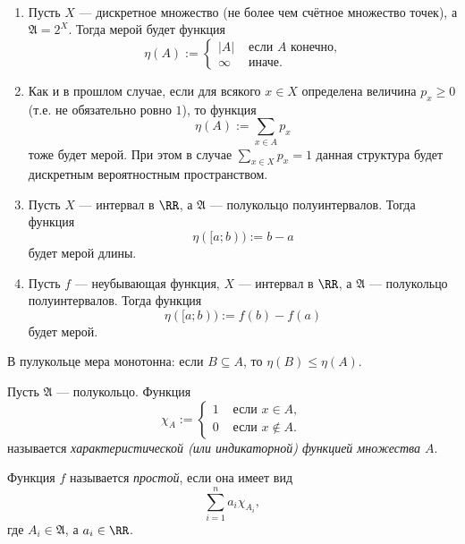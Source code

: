 \documentclass[12pt,a4paper]{article}
\begin{document}
    \begin{example}\ 
        \begin{enumerate}
            \item Пусть $X$ --- дискретное множество (не более чем счётное множество точек), а $\mathfrak{A} = 2^X$. Тогда мерой будет функция
                \[
                    \eta(A) :=
                    \begin{cases}
                        |A|& \text{ если $A$ конечно,}\\
                        \infty& \text{ иначе.}
                    \end{cases}
                \]
            \item Как и в прошлом случае, если для всякого $x \in X$ определена величина $p_x \geqslant 0$ (т.е. не обязательно ровно $1$), то функция
                \[\eta(A) := \sum_{x \in A} p_x\]
                тоже будет мерой. При этом в случае $\sum_{x \in X} p_x = 1$ данная структура будет дискретным вероятностным пространством.
            \item Пусть $X$ --- интервал в $\RR$, а $\mathfrak{A}$ --- полукольцо полуинтервалов. Тогда функция
                \[\eta([a; b)) := b - a\]
                будет мерой длины.
            \item Пусть $f$ --- неубывающая функция, $X$ --- интервал в $\RR$, а $\mathfrak{A}$ --- полукольцо полуинтервалов. Тогда функция
                \[\eta([a; b)) := f(b) - f(a)\]
                будет мерой.
        \end{enumerate}
    \end{example}

    \begin{lemma}
        В пулукольце мера монотонна: если $B \subseteq A$, то $\eta(B) \leqslant \eta(A)$.
    \end{lemma}

    \begin{definition}
        Пусть $\mathfrak{A}$ --- полукольцо. Функция
        \[
            \chi_A :=
            \begin{cases}
                1& \text{ если } x \in A,\\
                0& \text{ если } x \notin A.
            \end{cases}
        \]
        называется \emph{характеристической (или индикаторной) функцией множества $A$}.

        Функция $f$ называется \emph{простой}, если она имеет вид
        \[\sum_{i=1}^n a_i \chi_{A_i},\]
        где $A_i \in \mathfrak{A}$, а $a_i \in \RR$.
    \end{definition}
\end{document}
